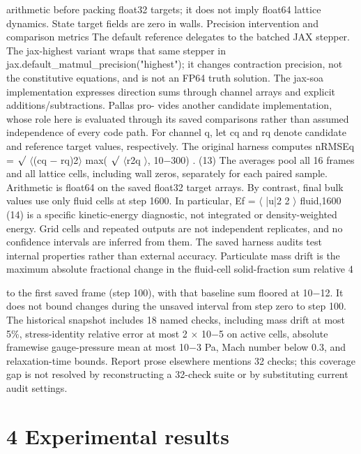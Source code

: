 \documentclass[11pt]{article}
\begin{document}
arithmetic before packing float32 targets; it does not imply float64 lattice dynamics. State target
fields are zero in walls.
Precision intervention and comparison metrics
The default reference delegates to the batched JAX stepper. The jax-highest variant wraps that
same stepper in jax.default\_matmul\_precision("highest"); it changes contraction precision,
not the constitutive equations, and is not an FP64 truth solution. The jax-soa implementation
expresses direction sums through channel arrays and explicit additions/subtractions. Pallas pro-
vides another candidate implementation, whose role here is evaluated through its saved comparisons
rather than assumed independence of every code path.
For channel q, let cq and rq denote candidate and reference target values, respectively. The
original harness computes
nRMSEq =
\ensuremath{\surd}
\ensuremath{\langle}(cq \ensuremath{-} rq)2\ensuremath{\rangle}
max(
\ensuremath{\surd}
\ensuremath{\langle}r2q \ensuremath{\rangle}, 10\ensuremath{-}300)
. (13)
The averages pool all 16 frames and all lattice cells, including wall zeros, separately for each paired
sample. Arithmetic is float64 on the saved float32 target arrays. By contrast, final bulk values use
only fluid cells at step 1600. In particular,
Ef =
\ensuremath{\langle} |u|2
2
\ensuremath{\rangle}
fluid,1600
(14)
is a specific kinetic-energy diagnostic, not integrated or density-weighted energy. Grid cells and
repeated outputs are not independent replicates, and no confidence intervals are inferred from them.
The saved harness audits test internal properties rather than external accuracy. Particulate
mass drift is the maximum absolute fractional change in the fluid-cell solid-fraction sum relative
4

to the first saved frame (step 100), with that baseline sum floored at 10\ensuremath{-}12. It does not bound
changes during the unsaved interval from step zero to step 100. The historical snapshot includes
18 named checks, including mass drift at most 5\%, stress-identity relative error at most 2 \ensuremath{\times} 10\ensuremath{-}5
on active cells, absolute framewise gauge-pressure mean at most 10\ensuremath{-}3 Pa, Mach number below 0.3,
and relaxation-time bounds. Report prose elsewhere mentions 32 checks; this coverage gap is not
resolved by reconstructing a 32-check suite or by substituting current audit settings.

\section*{4 Experimental results}
\end{document}
